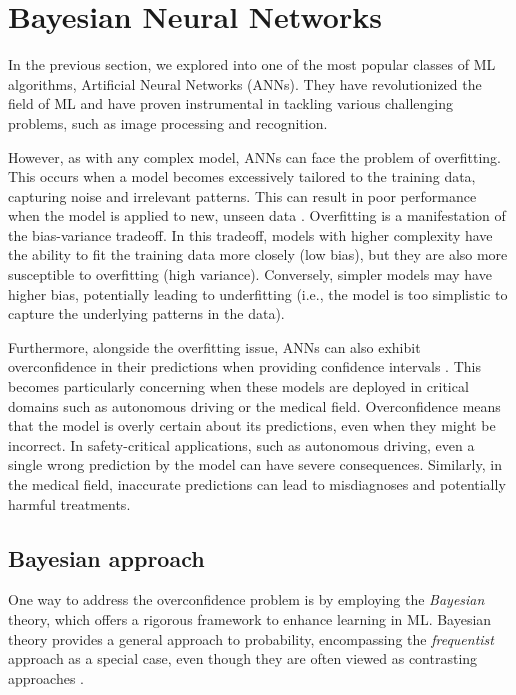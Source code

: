 \section{Bayesian Neural Networks}

In the previous section, we explored into one of the most popular classes of ML algorithms, Artificial Neural Networks (ANNs). They have revolutionized the field of ML and have proven instrumental in tackling various challenging problems, such as image processing and recognition.

However, as with any complex model, ANNs can face the problem of overfitting. This occurs when a model becomes excessively tailored to the training data, capturing noise and irrelevant patterns. This can result in poor performance when the model is applied to new, unseen data \cite{James2013}.
Overfitting is a manifestation of the bias-variance tradeoff. In this tradeoff, models with higher complexity have the ability to fit the training data more closely (low bias), but they are also more susceptible to overfitting (high variance). Conversely, simpler models may have higher bias, potentially leading to underfitting (i.e., the model is too simplistic to capture the underlying patterns in the data).

Furthermore, alongside the overfitting issue, ANNs can also exhibit overconfidence in their predictions when providing confidence intervals \cite{9756596}. This becomes particularly concerning when these models are deployed in critical domains such as autonomous driving or the medical field.
Overconfidence means that the model is overly certain about its predictions, even when they might be incorrect. In safety-critical applications, such as autonomous driving, even a single wrong prediction by the model can have severe consequences. Similarly, in the medical field, inaccurate predictions can lead to misdiagnoses and potentially harmful treatments.

\subsection{Bayesian approach}

One way to address the overconfidence problem is by employing the \textit{Bayesian} theory, which offers a rigorous framework to enhance learning in ML. Bayesian theory provides a general approach to probability, encompassing the \textit{frequentist} approach as a special case, even though they are often viewed as contrasting approaches \cite{noauthororeditor}. 

